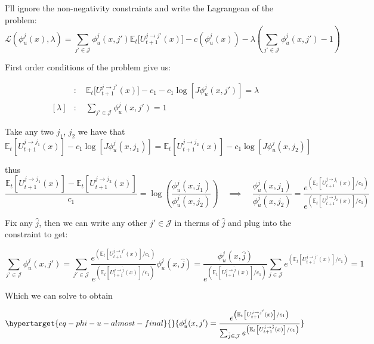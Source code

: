\documentclass[
  letterpaper,
  DIV=11,
  numbers=noendperiod]{scrreprt}
\begin{document}
I'll ignore the non-negativity constraints and write the Lagrangean of
the problem:
\[\mathcal{L}(\phi^j_u(x), \lambda) =  \sum_{j'\in\mathcal{J}} \phi^j_u(x, j')\mathbb{E}_t\Big[U^{j \to j'}_{t+1}(x)  \Big] -c(\phi^j_u(x)) - \lambda \left(\sum_{j'\in \mathcal{J}}\phi^j_u(x, j') - 1\right)\]

First order conditions of the problem give us:

\begin{align*}
  [\phi^j_u(x, j')] &:\quad \mathbb{E}_t\Big[U^{j \to j'}_{t+1}(x)  \Big] - c_1 - c_1 \log[J \phi^j_u(x, j')] = \lambda \\
  [\lambda] &: \quad \sum_{j'\in \mathcal{J}}\phi^j_u(x, j') = 1
\end{align*}

Take any two \(j_1\), \(j_2\) we have that
\[\mathbb{E}_t\left[U^{j \to j_1}_{t+1}(x)  \right] - c_1 \log[J \phi^j_u(x, j_1)] = \mathbb{E}_t\left[U^{j \to j_2}_{t+1}(x)  \right] - c_1 \log[J \phi^j_u(x, j_2)]\]

thus
\[\frac{\mathbb{E}_t\left[U^{j \to j_1}_{t+1}(x)\right] - \mathbb{E}_t\left[U^{j \to j_2}_{t+1}(x)\right]}{c_1} = \log\left(\frac{ \phi^j_u(x, j_1)}{ \phi^j_u(x, j_2)}\right) \quad \implies \quad \frac{ \phi^j_u(x, j_1)}{ \phi^j_u(x, j_2)} = \frac{e^{\left(\mathbb{E}_t\left[U^{j \to j_1}_{t+1}(x)\right] /c_1\right)}}{e^{\left(\mathbb{E}_t\left[U^{j \to j_2}_{t+1}(x)\right] /c_1\right)}}\]

Fix any \(\hat{j}\), then we can write any other \(j'\in\mathcal{J}\) in
therms of \(\hat{j}\) and plug into the constraint to get:

\[\sum_{j'\in \mathcal{J}}\phi^j_u(x, j') =\sum_{j'\in \mathcal{J}}\frac{e^{\left(\mathbb{E}_t\left[U^{j \to j'}_{t+1}(x)\right] /c_1\right)}}{e^{\left(\mathbb{E}_t\left[U^{j \to \hat{j}}_{t+1}(x)\right] /c_1\right)}} \phi^j_u(x, \hat{j}) = \frac{\phi^j_u(x, \hat{j})}{e^{\left(\mathbb{E}_t\left[U^{j \to \hat{j}}_{t+1}(x)\right] /c_1\right)}} \sum_{j\in \mathcal{J}}e^{\left(\mathbb{E}_t\left[U^{j \to j'}_{t+1}(x)\right] /c_1\right)} = 1\]

Which we can solve to obtain

\begin{equation}\protect\hypertarget{eq-phi-u-almost-final}{}{
  \phi^j_u(x,j') = \frac{e^{\left(\mathbb{E}_t\left[U^{j \to j'}_{t+1}(x)\right] /c_1\right)}}{\sum_{\tilde{j}\in \mathcal{J}}e^{\left(\mathbb{E}_t\left[U^{j \to \tilde{j}}_{t+1}(x)\right] /c_1\right)}}}\label{eq-phi-u-almost-final}\end{equation}
\end{document}
